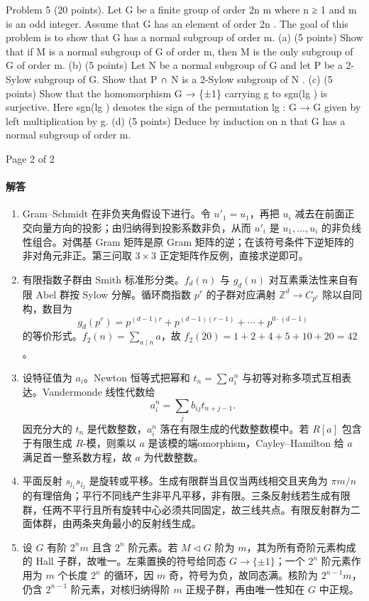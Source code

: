 \documentclass[UTF8,12pt]{ctexart}
\begin{document}
Problem 5 (20 points). Let G be a finite group of order 2n m where n ≥ 1 and m is an odd integer. Assume that G has an element of order 2n . The goal of this problem is to show that G has a normal subgroup of order m. (a) (5 points) Show that if M is a normal subgroup of G of order m, then M is the only subgroup of G of order m. (b) (5 points) Let N be a normal subgroup of G and let P be a 2-Sylow subgroup of G. Show that P ∩ N is a 2-Sylow subgroup of N . (c) (5 points) Show that the homomorphism G → \{±1\} carrying g to sgn(lg ) is surjective. Here sgn(lg ) denotes the sign of the permutation lg : G → G given by left multiplication by g. (d) (5 points) Deduce by induction on n that G has a normal subgroup of order m.

Page 2 of 2

\paragraph{解答}
\begin{enumerate}[label=\textbf{\arabic*.},leftmargin=2.2em]
\item Gram--Schmidt 在非负夹角假设下进行。令 \(u'_1=u_1\)，再把 \(u_i\) 减去在前面正交向量方向的投影；由归纳得到投影系数非负，从而 \(u'_i\) 是 \(u_1,\ldots,u_i\) 的非负线性组合。对偶基 Gram 矩阵是原 Gram 矩阵的逆；在该符号条件下逆矩阵的非对角元非正。第三问取 \(3\times3\) 正定矩阵作反例，直接求逆即可。
\item 有限指数子群由 Smith 标准形分类。\(f_d(n)\) 与 \(g_d(n)\) 对互素乘法性来自有限 Abel 群按 Sylow 分解。循环商指数 \(p^r\) 的子群对应满射 \(\mathbb Z^d\to C_{p^r}\) 除以自同构，数目为
\[
g_d(p^r)=p^{(d-1)r}+p^{(d-1)(r-1)}+\cdots+p^{0\cdot(d-1)}
\]
的等价形式。\(f_2(n)=\sum_{a\mid n}a\)，故 \(f_2(20)=1+2+4+5+10+20=42\)。
\item 设特征值为 \(a_i\)。Newton 恒等式把幂和 \(t_n=\sum a_i^n\) 与初等对称多项式互相表达。Vandermonde 线性代数给
\[
a_i^n=\sum_j b_{ij}t_{n+j-1}.
\]
因充分大的 \(t_n\) 是代数整数，\(a_i^n\) 落在有限生成的代数整数模中。若 \(R[a]\) 包含于有限生成 \(R\)-模，则乘以 \(a\) 是该模的端omorphism，Cayley--Hamilton 给 \(a\) 满足首一整系数方程，故 \(a\) 为代数整数。
\item 平面反射 \(s_{l_1}s_{l_2}\) 是旋转或平移。生成有限群当且仅当两线相交且夹角为 \(\pi m/n\) 的有理倍角；平行不同线产生非平凡平移，非有限。三条反射线若生成有限群，任两不平行且所有旋转中心必须共同固定，故三线共点。有限反射群为二面体群，由两条夹角最小的反射线生成。
\item 设 \(G\) 有阶 \(2^n m\) 且含 \(2^n\) 阶元素。若 \(M\lhd G\) 阶为 \(m\)，其为所有奇阶元素构成的 Hall 子群，故唯一。左乘置换的符号给同态 \(G\to\{\pm1\}\)；一个 \(2^n\) 阶元素作用为 \(m\) 个长度 \(2^n\) 的循环，因 \(m\) 奇，符号为负，故同态满。核阶为 \(2^{n-1}m\)，仍含 \(2^{n-1}\) 阶元素，对核归纳得阶 \(m\) 正规子群，再由唯一性知在 \(G\) 中正规。
\end{enumerate}
\end{document}
